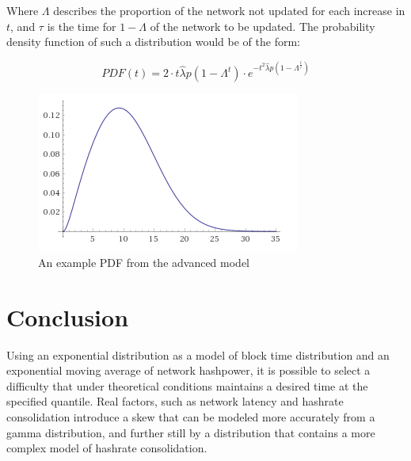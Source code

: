 \documentclass[]{article}
\begin{document}
Where $\Lambda$ describes the proportion of the network not updated for each increase in $t$, and $\tau$ is the time for $1 - \Lambda$ of the network to be updated. The probability density function of such a distribution would be of the form: 

\begin{equation}
PDF(t) = 2 \cdot t\hat{\lambda}p(1 - \Lambda^t) \cdot e^{-t^2\hat{\lambda}p(1 - \Lambda^\frac{t}{\tau})}
\end{equation}

\begin{figure}[h]
	\centering
	\includegraphics[width=0.7\linewidth]{"./bestpdf"}
	\caption{\footnotesize An example PDF from the advanced model \cite{AdvancedDistribution}}
\end{figure}

\pagebreak

\section{Conclusion}
Using an exponential distribution as a model of block time distribution and an exponential moving average of network hashpower, it is possible to select a difficulty that under theoretical conditions maintains a desired time at the specified quantile.  Real factors, such as network latency and hashrate consolidation introduce a skew that can be modeled more accurately from a gamma distribution, and further still by a distribution that contains a more complex model of hashrate consolidation. 



\end{document}
